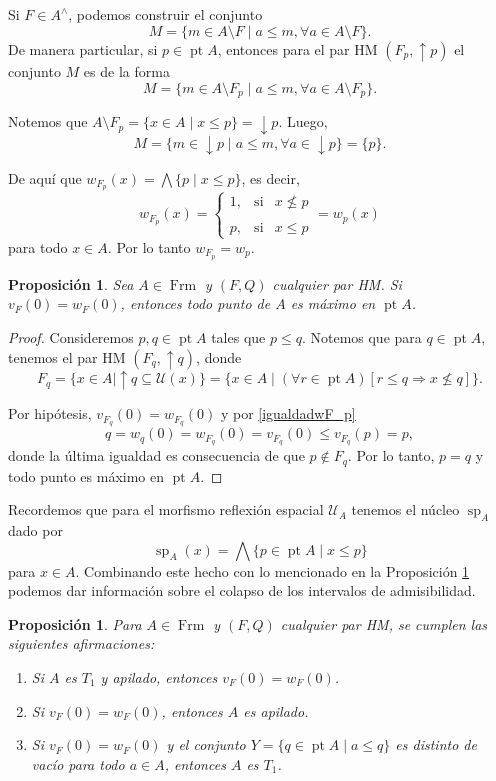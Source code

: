 \documentclass[12pt]{article}
\newtheorem{prop}[thm]{Proposición}
\DeclareMathOperator{\Frm}{Frm}
\DeclareMathOperator{\Sp}{sp}
\DeclareMathOperator{\pt}{pt}
\begin{document}
Si $F\in A^\wedge$, podemos construir el conjunto
\[
M=\{m\in A\setminus F\mid a\leq m, \forall a\in A\setminus F\}.
\]
De manera particular, si $p\in \pt A$, entonces para el par HM $(F_p, \uparrow p)$ el conjunto $M$ es de la forma
\[
M=\{m\in A\setminus F_p\mid a\leq m, \forall a\in A\setminus F_p\}.
\]

Notemos que $A\setminus F_p=\{x\in A\mid x\leq p\}=\downarrow p$. Luego,
\[
M=\{m\in \downarrow p\mid a\leq m, \forall a\in \downarrow p\}=\{p\}.
\]

De aquí que $w_{F_p}(x)=\bigwedge\{p\mid x\leq p\}$, es decir, 
\begin{equation}\label{igualdadwF_p}
w_{F_p}(x)= \left\{ \begin{array}{lcc} 1, & \text{si}  &  x\nleq p\\ \\ 
	p, & \text{si} & x\leq p 
\end{array} \right.=w_p(x)
\end{equation}
para todo $x\in A$. Por lo tanto $w_{F_p}=w_p$.\\

\begin{prop}\label{maximosenpt}
Sea $A\in \Frm$ y $(F, Q)$ cualquier par HM. Si $v_F(0)=w_F(0)$, entonces todo punto de $A$ es máximo en $\pt A$.
\end{prop}

\begin{proof}
Consideremos $p,q\in \pt A$ tales que $p\leq q$. Notemos que para $q\in \pt A$, tenemos el par HM $(F_q, \uparrow q)$, donde 
\[
F_q=\{x\in A\mid \uparrow q\subseteq \mathcal{U}(x)\}=\{x\in A\mid (\forall r\in \pt A)[r\leq q\Rightarrow x\nleq q]\}.
\]

Por hipótesis, $v_{F_q}(0)=w_{F_q}(0)$ y por \eqref{igualdadwF_p}
\[
q=w_q(0)=w_{F_q}(0)=v_{F_q}(0)\leq v_{F_q}(p)=p,
\]
donde la última igualdad es consecuencia de que $p\notin F_q$. Por lo tanto, $p=q$ y todo punto es máximo en $\pt A$.
\end{proof}

Recordemos que para el morfismo reflexión espacial $\mathcal{U}_A$ tenemos el núcleo $\Sp_A$ dado por
\[
\Sp_A(x)=\bigwedge\{p\in \pt A\mid x\leq p\}
\]
para $x\in A$. Combinando este hecho con lo mencionado en la Proposición \ref{maximosenpt} podemos dar información sobre el colapso de 
los intervalos de admisibilidad.

\begin{prop}\label{focales}
Para $A\in \Frm$ y $(F, Q)$ cualquier par HM, se cumplen las siguientes afirmaciones:
\begin{enumerate}
\item Si $A$ es $T_1$ y apilado, entonces $v_F(0)=w_F(0)$.
\item Si $v_F(0)=w_F(0)$, entonces $A$ es apilado.
\item Si $v_F(0)=w_F(0)$ y el conjunto $Y=\{q\in \pt A\mid a\leq q\}$ es distinto de vacío para todo $a\in A$, entonces $A$ es $T_1$.
\end{enumerate}
\end{prop}
\end{document}
